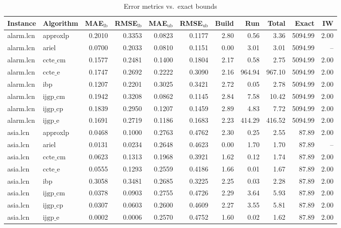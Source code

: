 \begin{table}[ht]
\centering
\scriptsize
\caption{Error metrics vs.\ exact bounds}
\begin{tabular}{llrrrrrrrrr}
\toprule
Instance & Algorithm & MAE$_{\text{lb}}$ & RMSE$_{\text{lb}}$ & MAE$_{\text{ub}}$ & RMSE$_{\text{ub}}$ & Build & Run & Total & Exact & IW \\
\midrule
alarm.lcn & approxlp & 0.2010 & 0.3353 & 0.0823 & 0.1177 & 2.80 & 0.56 & 3.36 & 5094.99 & 2.00 \\
alarm.lcn & ariel & 0.0700 & 0.2033 & 0.0810 & 0.1151 & 0.00 & 3.01 & 3.01 & 5094.99 & -- \\
alarm.lcn & $\text{ccte\_cm}$ & 0.1577 & 0.2481 & 0.1400 & 0.1804 & 2.17 & 0.58 & 2.75 & 5094.99 & 2.00 \\
alarm.lcn & $\text{ccte\_e}$ & 0.1747 & 0.2692 & 0.2222 & 0.3090 & 2.16 & 964.94 & 967.10 & 5094.99 & 2.00 \\
alarm.lcn & ibp & 0.1207 & 0.2201 & 0.3025 & 0.3421 & 2.72 & 0.05 & 2.78 & 5094.99 & 2.00 \\
alarm.lcn & $\text{ijgp\_cm}$ & 0.1942 & 0.3208 & 0.0862 & 0.1145 & 2.84 & 7.58 & 10.42 & 5094.99 & 2.00 \\
alarm.lcn & $\text{ijgp\_cp}$ & 0.1839 & 0.2950 & 0.1207 & 0.1459 & 2.89 & 4.83 & 7.72 & 5094.99 & 2.00 \\
alarm.lcn & $\text{ijgp\_e}$ & 0.1691 & 0.2719 & 0.1186 & 0.1683 & 2.23 & 414.29 & 416.52 & 5094.99 & 2.00 \\
asia.lcn & approxlp & 0.0468 & 0.1000 & 0.2763 & 0.4762 & 2.30 & 0.25 & 2.55 & 87.89 & 2.00 \\
asia.lcn & ariel & 0.0131 & 0.0234 & 0.2648 & 0.4623 & 0.00 & 1.70 & 1.70 & 87.89 & -- \\
asia.lcn & $\text{ccte\_cm}$ & 0.0623 & 0.1313 & 0.1968 & 0.3921 & 1.62 & 0.12 & 1.74 & 87.89 & 2.00 \\
asia.lcn & $\text{ccte\_e}$ & 0.0555 & 0.1293 & 0.2559 & 0.4186 & 1.66 & 0.01 & 1.67 & 87.89 & 2.00 \\
asia.lcn & ibp & 0.3058 & 0.3481 & 0.2685 & 0.3225 & 2.25 & 0.03 & 2.28 & 87.89 & 2.00 \\
asia.lcn & $\text{ijgp\_cm}$ & 0.0378 & 0.0903 & 0.2755 & 0.4726 & 2.29 & 3.64 & 5.93 & 87.89 & 2.00 \\
asia.lcn & $\text{ijgp\_cp}$ & 0.0307 & 0.0603 & 0.2600 & 0.4609 & 2.27 & 3.55 & 5.81 & 87.89 & 2.00 \\
asia.lcn & $\text{ijgp\_e}$ & 0.0002 & 0.0006 & 0.2570 & 0.4752 & 1.60 & 0.02 & 1.62 & 87.89 & 2.00 \\

\end{tabular}
\end{table}
